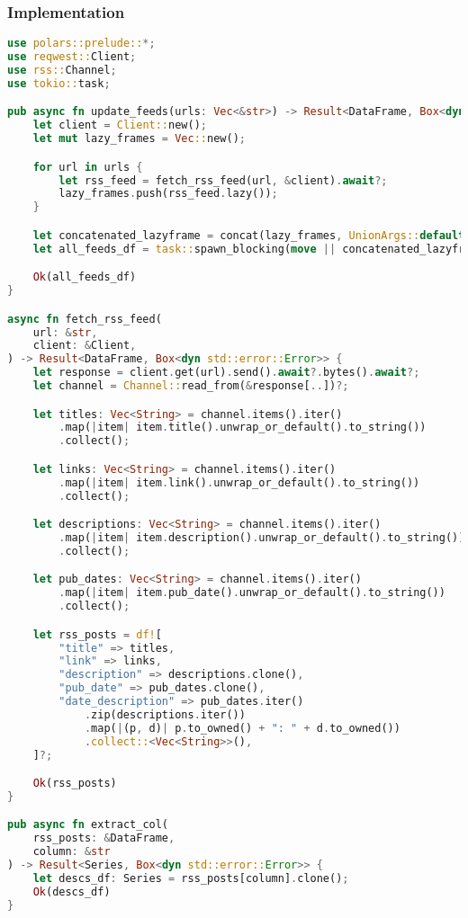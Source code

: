 \subsubsection{Implementation}
\begin{lstlisting}[language=rust]
use polars::prelude::*;
use reqwest::Client;
use rss::Channel;
use tokio::task;

pub async fn update_feeds(urls: Vec<&str>) -> Result<DataFrame, Box<dyn std::error::Error>> {
    let client = Client::new();
    let mut lazy_frames = Vec::new();

    for url in urls {
        let rss_feed = fetch_rss_feed(url, &client).await?;
        lazy_frames.push(rss_feed.lazy());
    }

    let concatenated_lazyframe = concat(lazy_frames, UnionArgs::default())?;
    let all_feeds_df = task::spawn_blocking(move || concatenated_lazyframe.collect()).await??;

    Ok(all_feeds_df)
}

async fn fetch_rss_feed(
    url: &str,
    client: &Client,
) -> Result<DataFrame, Box<dyn std::error::Error>> {
    let response = client.get(url).send().await?.bytes().await?;
    let channel = Channel::read_from(&response[..])?;

    let titles: Vec<String> = channel.items().iter()
        .map(|item| item.title().unwrap_or_default().to_string())
        .collect();

    let links: Vec<String> = channel.items().iter()
        .map(|item| item.link().unwrap_or_default().to_string())
        .collect();

    let descriptions: Vec<String> = channel.items().iter()
        .map(|item| item.description().unwrap_or_default().to_string())
        .collect();

    let pub_dates: Vec<String> = channel.items().iter()
        .map(|item| item.pub_date().unwrap_or_default().to_string())
        .collect();

    let rss_posts = df![
        "title" => titles,
        "link" => links,
        "description" => descriptions.clone(),
        "pub_date" => pub_dates.clone(),
        "date_description" => pub_dates.iter()
            .zip(descriptions.iter())
            .map(|(p, d)| p.to_owned() + ": " + d.to_owned())
            .collect::<Vec<String>>(),
    ]?;

    Ok(rss_posts)
}

pub async fn extract_col(
    rss_posts: &DataFrame,
    column: &str
) -> Result<Series, Box<dyn std::error::Error>> {
    let descs_df: Series = rss_posts[column].clone();
    Ok(descs_df)
}
\end{lstlisting}

